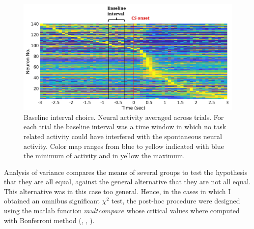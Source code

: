 \begin{figure}
    \centering
    \includegraphics[scale=0.6]{figures/Baseline.pdf}
    \caption{Baseline interval choice. Neural activity averaged across trials. For each trial the baseline interval was a time window in which no task related activity could have interfered with the spontaneous neural activity. Color map ranges from blue to yellow indicated with blue the minimum of activity and in yellow the maximum.}
    \label{fig:Baseline}
\end{figure}
Analysis of variance compares the means of several groups to test the hypothesis that they are all equal, against the general alternative that they are not all equal. This alternative was in this case too general. Hence, in the cases in which I obtained an omnibus significant $\chi^2$ test, the post-hoc procedure were designed using the matlab function $\textit{multcompare}$ whose critical values where computed with Bonferroni method (\cite{Bonferroni}, \cite{Dunn1958}, \cite{Dunn1961}).\\
